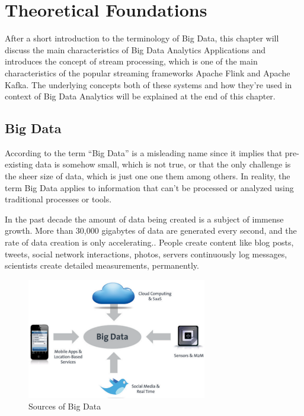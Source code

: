 \chapter{Theoretical Foundations}

After a short introduction to the terminology of Big Data, this chapter will discuss the main
characteristics of Big Data Analytics Applications and introduces the concept of stream processing,
which is one of the main characteristics of the popular streaming frameworks Apache Flink and
Apache Kafka. The underlying concepts both of these systems and how they're used in context of
Big Data Analytics will be explained at the end of this chapter.

\section{Big Data}

According to \cite{Marz15} the term “Big Data” is a misleading name since it implies that pre-existing
data is somehow small, which is not true, or that the only challenge is the sheer size of data, which
is just one one them among others. In reality, the term Big Data applies to information that can’t be
processed or analyzed using traditional processes or tools.

In the past decade the amount of data being created is a subject of immense growth. More than
30,000 gigabytes of data are generated every second, and the rate of data creation is only
accelerating.\cite{Marz15}. People create content like blog posts, tweets, social network interactions,
photos, servers continuously log messages, scientists create detailed measurements, permanently.

\begin{figure}[H]
	\centering
	\includegraphics[width=0.7\textwidth]{../images/04-sources-of-bigdata.png}
	\caption{Sources of Big Data{\cite{Bitk12}}}
	\label{sources-of-bigdata}
\end{figure}

